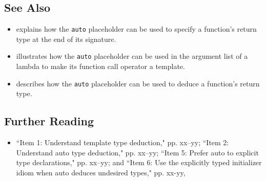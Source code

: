 \subsection[See Also]{See Also}\label{see-also}

\begin{itemize}
\item{explains how the \lstinline!auto! placeholder can be used to specify a function’s return type at the end of its signature.}
\item{ illustrates how the \lstinline!auto! placeholder can be used in the argument list of a lambda to make its function call operator a template.}
\item{describes how the \lstinline!auto! placeholder can be used to deduce a function’s return type.}
\end{itemize}

\subsection[Further Reading]{Further Reading}

\begin{itemize}
\item{``Item 1: Understand template type deduction," pp. xx--yy; ``Item 2: Understand auto type deduction," pp. xx--yy; ``Item 5: Prefer auto to explicit type declarations," pp. xx--yy; and ``Item 6: Use the explicitly typed initializer idiom when auto deduces undesired types," pp. xx-yy, \cite{meyers15b}}
\end{itemize}
 
 
